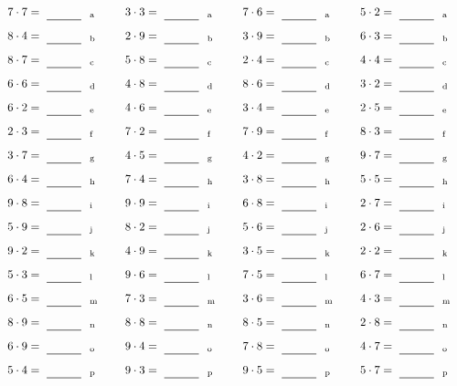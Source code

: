 \documentclass
[
  draft    = true,
  fontsize = 11pt,
  parskip  = half-
]
{scrartcl}
\begin{document}
\par\vfill\par
\begin{align*}
    \pline{7\cdot7}&=\rline{a}
  & \pline{3\cdot3}&=\rline{a}
  & \pline{7\cdot6}&=\rline{a}
  & \pline{5\cdot2}&=\rline{a} \\[1ex]
    \pline{8\cdot4}&=\rline{b}
  & \pline{2\cdot9}&=\rline{b}
  & \pline{3\cdot9}&=\rline{b}
  & \pline{6\cdot3}&=\rline{b} \\[1ex]
    \pline{8\cdot7}&=\rline{c}
  & \pline{5\cdot8}&=\rline{c}
  & \pline{2\cdot4}&=\rline{c}
  & \pline{4\cdot4}&=\rline{c} \\[1ex]
    \pline{6\cdot6}&=\rline{d}
  & \pline{4\cdot8}&=\rline{d}
  & \pline{8\cdot6}&=\rline{d}
  & \pline{3\cdot2}&=\rline{d} \\[1ex]
    \pline{6\cdot2}&=\rline{e}
  & \pline{4\cdot6}&=\rline{e}
  & \pline{3\cdot4}&=\rline{e}
  & \pline{2\cdot5}&=\rline{e} \\[1ex]
    \pline{2\cdot3}&=\rline{f}
  & \pline{7\cdot2}&=\rline{f}
  & \pline{7\cdot9}&=\rline{f}
  & \pline{8\cdot3}&=\rline{f} \\[1ex]
    \pline{3\cdot7}&=\rline{g}
  & \pline{4\cdot5}&=\rline{g}
  & \pline{4\cdot2}&=\rline{g}
  & \pline{9\cdot7}&=\rline{g} \\[1ex]
    \pline{6\cdot4}&=\rline{h}
  & \pline{7\cdot4}&=\rline{h}
  & \pline{3\cdot8}&=\rline{h}
  & \pline{5\cdot5}&=\rline{h} \\[1ex]
    \pline{9\cdot8}&=\rline{i}
  & \pline{9\cdot9}&=\rline{i}
  & \pline{6\cdot8}&=\rline{i}
  & \pline{2\cdot7}&=\rline{i} \\[1ex]
    \pline{5\cdot9}&=\rline{j}
  & \pline{8\cdot2}&=\rline{j}
  & \pline{5\cdot6}&=\rline{j}
  & \pline{2\cdot6}&=\rline{j} \\[1ex]
    \pline{9\cdot2}&=\rline{k}
  & \pline{4\cdot9}&=\rline{k}
  & \pline{3\cdot5}&=\rline{k}
  & \pline{2\cdot2}&=\rline{k} \\[1ex]
    \pline{5\cdot3}&=\rline{l}
  & \pline{9\cdot6}&=\rline{l}
  & \pline{7\cdot5}&=\rline{l}
  & \pline{6\cdot7}&=\rline{l} \\[1ex]
    \pline{6\cdot5}&=\rline{m}
  & \pline{7\cdot3}&=\rline{m}
  & \pline{3\cdot6}&=\rline{m}
  & \pline{4\cdot3}&=\rline{m} \\[1ex]
    \pline{8\cdot9}&=\rline{n}
  & \pline{8\cdot8}&=\rline{n}
  & \pline{8\cdot5}&=\rline{n}
  & \pline{2\cdot8}&=\rline{n} \\[1ex]
    \pline{6\cdot9}&=\rline{o}
  & \pline{9\cdot4}&=\rline{o}
  & \pline{7\cdot8}&=\rline{o}
  & \pline{4\cdot7}&=\rline{o} \\[1ex]
    \pline{5\cdot4}&=\rline{p}
  & \pline{9\cdot3}&=\rline{p}
  & \pline{9\cdot5}&=\rline{p}
  & \pline{5\cdot7}&=\rline{p}
\end{align*}
\end{document}
